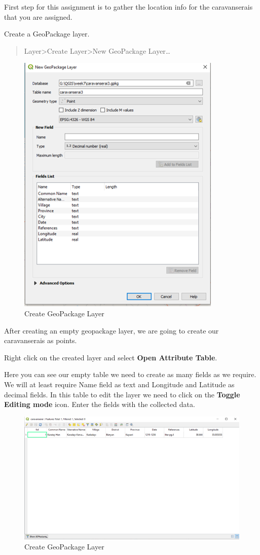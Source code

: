 \documentclass[
]{book}
\begin{document}
First step for this assignment is to gather the location info for the caravanserais that you are assigned.

Create a GeoPackage layer.

\begin{quote}
Layer\textgreater Create Layer\textgreater New GeoPackage Layer\ldots{}
\end{quote}

\begin{figure}
\centering
\includegraphics{Images/geopackage.png}
\caption{Create GeoPackage Layer}
\end{figure}

After creating an empty geopackage layer, we are going to create our caravanserais as points.

Right click on the created layer and select \textbf{Open Attribute Table}.

Here you can see our empty table we need to create as many fields as we require. We will at least require Name field as text and Longitude and Latitude as decimal fields. In this table to edit the layer we need to click on the \textbf{Toggle Editing mode} icon. Enter the fields with the collected data.

\begin{figure}
\centering
\includegraphics{Images/caravanseraiTable.png}
\caption{Create GeoPackage Layer}
\end{figure}
\end{document}
